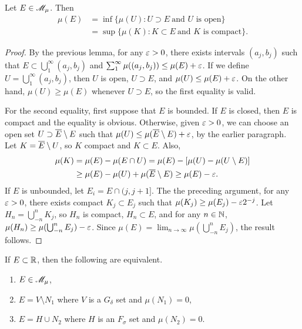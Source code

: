 \documentclass[12pt]{article} %
\begin{document}
\begin{theorem}\label{thm:1.18}
    Let $E \in \mathscr{M}_\mu$. Then \begin{align*}
        \mu(E) &= \inf\{\mu(U) : U \supset E \ \text{and $U$ is open}\}\\
        &= \sup\{\mu(K) : K \subset E \ \text{and $K$ is compact}\}.
    \end{align*}
\end{theorem}

\begin{proof}
    By the previous lemma, for any $\varepsilon > 0$, there exists intervals $(a_j, b_j)$ such that $E \subset \bigcup_1^\infty (a_j, b_j)$ and $\sum_1^\infty \mu((a_j, b_j)) \leq \mu(E) + \varepsilon$. If we define $U = \bigcup_1^\infty (a_j, b_j)$, then $U$ is open, $U \supset E$, and $\mu(U) \leq \mu(E) + \varepsilon$. On the other hand, $\mu(U) \geq \mu(E)$ whenever $U \supset E$, so the first equality is valid.

    For the second equality, first suppose that $E$ is bounded. If $E$ is closed, then $E$ is compact and the equality is obvious. Otherwise, given $\varepsilon > 0$, we can choose an open set $U \supset \overline{E} \setminus E$ such that $\mu(U) \leq \mu(\overline{E} \setminus E) + \varepsilon$, by the earlier paragraph. Let $K = \overline{E} \setminus U$, so $K$ compact and $K \subset E$. Also, \begin{align*}
        \mu(K) &= \mu(E) - \mu(E \cap U) = \mu(E) - [\mu(U) - \mu(U\setminus E)]\\
        &\geq \mu(E) - \mu(U) + \mu(\overline{E}\setminus E) \geq \mu(E) - \varepsilon.
    \end{align*}
    If $E$ is unbounded, let $E_i = E \cap (j, j+1]$. The the preceding argument, for any $\varepsilon > 0$, there exists compact $K_j \subset E_j$ such that $\mu(K_j) \geq \mu(E_j) - \varepsilon2^{-j}$. Let $H_n = \bigcup_{-n}^{n} K_j$, so $H_n$ is compact, $H_n \subset E$, and for any $n \in \mathbb{N}$, $\mu(H_n) \geq \mu(\bigcup_{-n}^{n} E_j) - \varepsilon$. Since $\mu(E) = \lim_{n \to \infty} \mu(\bigcup_{-n}^{n}E_j)$, the result follows.
\end{proof}

\begin{theorem}\label{thm:characterizing-lebesgue-steiltjes-measurable-sets}
    If $E \subset \mathbb{R}$, then the following are equivalent.\begin{enumerate}
        \item $E \in \mathscr{M}_\mu$,
        \item $E = V \setminus N_1$ where $V$ is a $G_\delta$ set and $\mu(N_1) = 0$,
        \item $E = H \cup N_2$ where $H$ is an $F_\sigma$ set and $\mu(N_2) = 0$.
    \end{enumerate}
\end{theorem}
\end{document}
